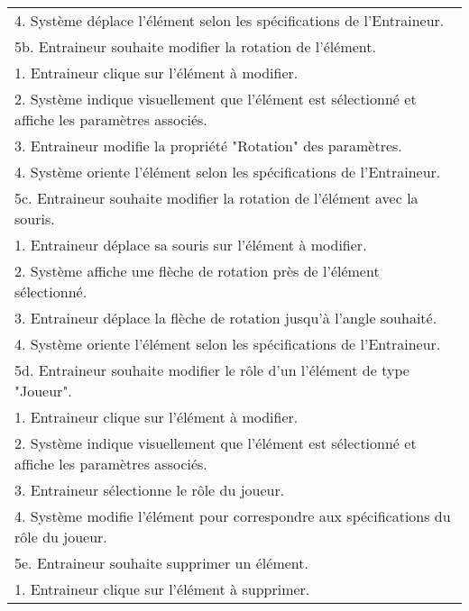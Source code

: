 \begin{longtable}{|p{16cm}|}
	\hspace{0.5cm}4. Système déplace l'élément selon les spécifications de l'Entraineur.\\
	5b. Entraineur souhaite modifier la rotation de l'élément.\\
	\hspace{0.5cm}1. Entraineur clique sur l'élément à modifier.\\
	\hspace{0.5cm}2. Système indique visuellement que l'élément est sélectionné et affiche les paramètres associés.\\
	\hspace{0.5cm}3. Entraineur modifie la propriété "Rotation" des paramètres.\\
	\hspace{0.5cm}4. Système oriente l'élément selon les spécifications de l'Entraineur.\\
	5c. Entraineur souhaite modifier la rotation de l'élément avec la souris.\\
	\hspace{0.5cm}1. Entraineur déplace sa souris sur l'élément à modifier.\\
	\hspace{0.5cm}2. Système affiche une flèche de rotation près de l'élément sélectionné.\\
	\hspace{0.5cm}3. Entraineur déplace la flèche de rotation jusqu'à l'angle souhaité.\\
	\hspace{0.5cm}4. Système oriente l'élément selon les spécifications de l'Entraineur.\\
	5d. Entraineur souhaite modifier le rôle d'un l'élément de type "Joueur".\\
	\hspace{0.5cm}1. Entraineur clique sur l'élément à modifier.\\
	\hspace{0.5cm}2. Système indique visuellement que l'élément est sélectionné et affiche les paramètres associés.\\
	\hspace{0.5cm}3. Entraineur sélectionne le rôle du joueur.\\
	\hspace{0.5cm}4. Système modifie l'élément pour correspondre aux spécifications du rôle du joueur.\\
	5e. Entraineur souhaite supprimer un élément.\\
	\hspace{0.5cm}1. Entraineur clique sur l'élément à supprimer.\\

\end{longtable}
